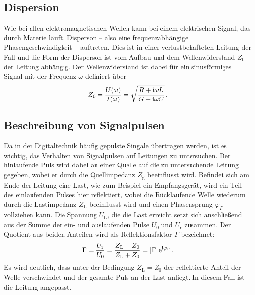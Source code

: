 \subsection{Dispersion} %
\label{sub:dispersion}
Wie bei allen elektromagnetischen Wellen kann bei einem elektrischen Signal,
das durch Materie läuft, Disperson -- also eine frequenzabhängige
Phasengeschwindigkeit -- auftreten.
Dies ist in einer verlustbehafteten Leitung der Fall und die Form der Disperson
ist vom Aufbau und dem Wellenwiderstand $Z_0$ der Leitung abhängig.
Der Wellenwiderstand ist dabei für ein sinusförmiges Signal mit der Frequenz
$\omega$ definiert über:
\begin{equation*}
    Z_0 = \frac{U(\omega)}{I(\omega)}=\sqrt{\frac{R+\mathrm{i}\omega L}{G+\mathrm{i}\omega C}}\,.
\end{equation*}

\subsection{Beschreibung von Signalpulsen} %
\label{sub:signalpulse}
Da in der Digitaltechnik häufig gepulste Singale übertragen werden, ist es
wichtig, das Verhalten von Signalpulsen auf Leitungen zu untersuchen.
Der hinlaufende Puls wird dabei an einer Quelle auf die zu untersuchende
Leitung gegeben, wobei er durch die Quellimpedanz $Z_\text{g}$ beeinflusst
wird.
Befindet sich am Ende der Leitung eine Last, wie zum Beispiel ein
Empfangsgerät, wird ein Teil des einlaufenden Pulses hier reflektiert, wobei
die Rücklaufende Welle wiederum durch die Lastimpedanz $Z_\text{L}$
beeinflusst wird und einen Phasensprung $\varphi_\Gamma$ vollziehen kann.
Die Spannung $U_\text{L}$, die die Last erreicht setzt sich anschließend aus
der Summe der ein- und auslaufenden Pulse $U_0$ und $U_\text{r}$ zusammen.
Der Quotient aus beiden Anteilen wird als Reflektionsfaktor $\Gamma$
bezeichnet:
\begin{equation*}
    \Gamma = \frac{U_\text{r}}{U_0} = \frac{Z_\text{L} - Z_0}{Z_\text{L} + Z_0} = \left|\Gamma\right|\mathrm{e}^{\mathrm{i}\varphi_\Gamma}\,.
\end{equation*}
Es wird deutlich, dass unter der Bedingung $Z_\text{L} = Z_0$ der reflektierte
Anteil der Welle verschwindet und der gesamte Puls an der Last anliegt.
In diesem Fall ist die Leitung angepasst.

